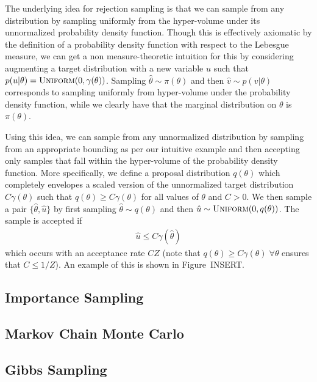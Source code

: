 The underlying idea for rejection sampling is that we can sample from any distribution
by sampling uniformly from the hyper-volume under its unnormalized probability density function.
Though this is effectively axiomatic by the definition of a probability density
function with respect to the Lebesgue measure, we can get a non measure-theoretic
intuition for this by considering augmenting a target distribution with a new variable $u$
such that $p(u|\theta) = \textsc{Uniform}(0,\gamma(\theta))$.  Sampling 
$\hat{\theta} \sim \pi(\theta)$ and then $\hat{v}\sim p(v|\theta)$ corresponds to
sampling uniformly from hyper-volume under the probability density function, while we
clearly have that the marginal distribution on $\theta$ is $\pi(\theta)$.

Using this idea, we can sample from any unnormalized distribution by sampling from
an appropriate bounding as per our intuitive example and then accepting only samples
that fall within the hyper-volume of the probability density function. 
More specifically, we define a proposal
distribution $q(\theta)$ which completely envelopes a
scaled version of the unnormalized target distribution $C\gamma(\theta)$ such that 
$q(\theta)\ge C \gamma(\theta)$ for all values of $\theta$ and $C>0$.  We then sample a pair 
$\{\hat{\theta},\hat{u}\}$ by first sampling $\hat{\theta} \sim q(\theta)$ and then
$\hat{u} \sim \textsc{Uniform}(0,q(\theta))$.  The sample is accepted if
\begin{align}
	\label{eq:inf:rej-acc-criteria}
	\hat{u} \le C \gamma(\hat{\theta})
\end{align}
which occurs with an acceptance rate $CZ$ (note that $q(\theta)\ge C \gamma(\theta) \; \forall \theta$
ensures that $C \le 1/Z$).
An example of this is shown in Figure~INSERT.


\subsection{Importance Sampling}
\label{sec:inf:foundation:importance}

\subsection{Markov Chain Monte Carlo}
\label{sec:inf:foundation:mcmc}

\subsection{Gibbs Sampling}
\label{sec:inf:foundation:gibbs}